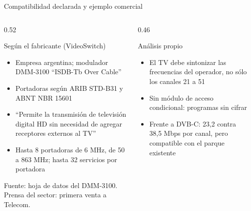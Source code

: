 \begin{frame}{Compatibilidad declarada y ejemplo comercial}
  \begin{columns}[T]
    \begin{column}{0.52\textwidth}
      \begin{block}{Según el fabricante (VideoSwitch)}
        \scriptsize
        \begin{itemize}
          \item Empresa argentina; modulador DMM-3100 ``ISDB-Tb Over Cable''
          \item Portadoras según ARIB STD-B31 y ABNT NBR 15601
          \item ``Permite la transmisión de televisión digital HD sin necesidad de agregar receptores externos al TV''
          \item Hasta 8 portadoras de 6 MHz, de 50 a 863 MHz; hasta 32 servicios por portadora
        \end{itemize}
        {\tiny Fuente: hoja de datos del DMM-3100. Prensa del sector: primera venta a Telecom.}
      \end{block}
    \end{column}
    \begin{column}{0.46\textwidth}
      \begin{block}{Análisis propio}
        \scriptsize
        \begin{itemize}
          \item El TV debe sintonizar las frecuencias del operador, no sólo los canales 21 a 51
          \item Sin módulo de acceso condicional: programas sin cifrar
          \item Frente a DVB-C: 23,2 contra 38,5 Mbps por canal, pero compatible con el parque existente
        \end{itemize}
      \end{block}
    \end{column}
  \end{columns}
\end{frame}

